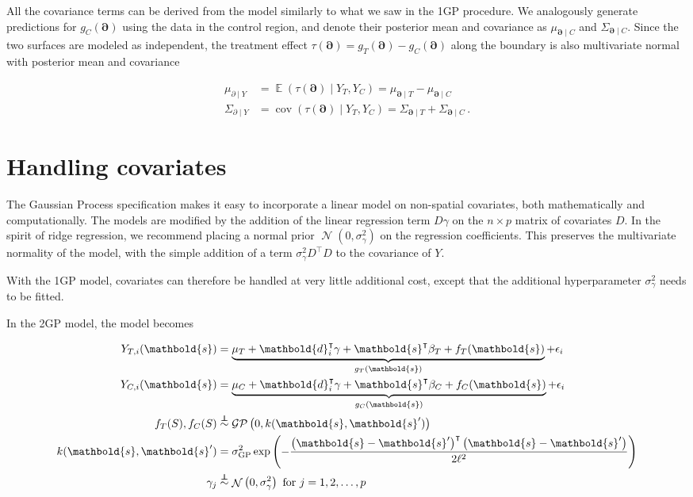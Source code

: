 \documentclass[letter]{article}
\newcommand{\genericdel}[3]{%
      \left#1#3\right#2
    }
\newcommand{\del}[1]{\genericdel(){#1}}
\DeclareMathOperator{\E}{\mathbb{E}}
\DeclareMathOperator{\cov}{{cov}}
\DeclareMathOperator{\normal}{\mathcal{N}}
\newcommand{\gp}{\mathcal{GP}}
\newcommand{\trans}{^{\intercal}}
\newcommand{\sigmaf}{\sigma_{\mathrm{GP}}}
\newcommand{\sigmagamma}{\sigma_{\gamma}}
\newcommand{\svec}{\mathbold{s}}
\newcommand{\dvec}{\mathbold{d}}
\newcommand{\indep}{\protect\mathpalette{\protect\independenT}{\perp}}
\def\independenT#1#2{\mathrel{\rlap{$#1#2$}\mkern2mu{#1#2}}}
\newcommand{\boundary}{\partial}
\newcommand{\sentinels}{\bm{\boundary}}
\begin{document}
All the covariance terms can be derived from the model similarly to what we saw in the 1GP procedure.
We analogously generate predictions for \(g_C(\sentinels)\) using the data in the control region, and denote their posterior mean and covariance as \(\mu_{\sentinels \mid C}\) and \(\Sigma_{\sentinels \mid C}\). Since the two surfaces are modeled as independent, the treatment effect \(\tau(\sentinels)=g_T(\sentinels)-g_C(\sentinels)\) along the boundary is also multivariate normal with posterior mean and covariance

\begin{equation}
\label{eq:postvar2gp}
\begin{split}
    \mu_{\boundary \mid Y} &= \E \del{\tau(\sentinels) \mid Y_T, Y_C} = \mu_{\sentinels \mid T} - \mu_{\sentinels \mid C} \\
    \Sigma_{\boundary \mid Y} &= \cov\del{\tau(\sentinels) \mid Y_T, Y_C} = \Sigma_{\sentinels \mid T} + \Sigma_{\sentinels \mid C}\,.
\end{split}\end{equation}
    


    	\section{Handling covariates}\label{handling-covariates}

The Gaussian Process specification makes it easy to incorporate a linear model on non-spatial covariates, both mathematically and computationally.
The models are modified by the addition of the linear regression term \(D \gamma\) on the \(n \times p\) matrix of covariates \(D\). In the spirit of ridge regression, we recommend placing a normal prior \(\normal(0,\sigmagamma^2)\) on the regression coefficients. This preserves the multivariate normality of the model, with the simple addition of a term \(\sigmagamma^2 D\trans D\) to the covariance of \(Y\).

With the 1GP model, covariates can therefore be handled at very little additional cost, except that the additional hyperparameter \(\sigmagamma^2\) needs to be fitted.

In the 2GP model, the model becomes

\begin{equation}
\begin{split}
Y_{T,i}(\svec) &= \underbrace{\mu_T + \dvec_i\trans \gamma + \svec\trans\beta_T + f_T(\svec)}_{g_T(\svec)} + \epsilon_i \\
Y_{C,i}(\svec) &= \underbrace{\mu_C + \dvec_i\trans \gamma + \svec\trans\beta_C + f_C(\svec)}_{g_C(\svec)} + \epsilon_i \\
f_T(S), f_C(S) &\overset{\indep}{\sim} \gp\del{0, k(\svec, \svec')} \\
k(\svec,\svec') &= \sigmaf^2 \exp\del{ - \frac{\del{\svec-\svec'}\trans\del{\svec-\svec'}}{2 \ell^2}} \\
\gamma_j &\overset{\indep}{\sim} \normal\del{0,\sigmagamma^2}\text{ for }j=1,2,\ldots,p
\end{split}
\end{equation}
\end{document}
